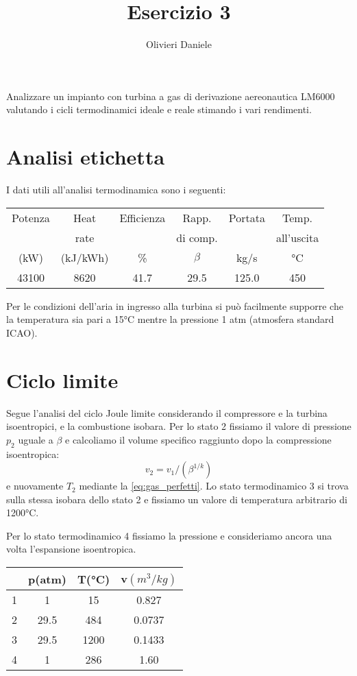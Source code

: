 \documentclass[a4paper,12pt]{article}
\title{Esercizio 3}
\author{Olivieri Daniele}
\date{}
\begin{document}
\maketitle

Analizzare un impianto con turbina a gas di derivazione aereonautica LM6000 valutando i cicli termodinamici ideale e reale stimando i vari rendimenti.
\section{Analisi etichetta}
\label{sec:analisi_etichetta}
I dati utili all'analisi termodinamica sono i seguenti:
\begin{center}
    \begin{tabular}{cccccc}
         Potenza   & Heat  & Efficienza   & Rapp.  & Portata    &  Temp. \\
                   &rate  &              & di comp. &    &        all'uscita \\
            (kW)   &  (kJ/kWh) & \%    &    $\beta$  &   kg/s      &  °C \\ \hline
        43100    &  8620    &  41.7   &  29.5  &     125.0        &  450
    \end{tabular}
\end{center}
Per le condizioni dell'aria in ingresso alla turbina si può facilmente supporre che la temperatura sia pari a 15°C mentre la pressione 1 atm
(atmosfera standard ICAO).

\section{Ciclo limite}
\label{sec:ciclo_limite}
Segue l'analisi del ciclo Joule limite considerando il compressore e la turbina isoentropici, e la combustione isobara.
Per lo stato 2 fissiamo il valore di pressione $p_2$ uguale a $\beta$ e calcoliamo il volume specifico raggiunto dopo la compressione isoentropica:
\begin{equation*}
    v_2 = v_1/(\beta^{1/k})
\end{equation*}
e nuovamente $T_2$ mediante la \eqref{eq:gas_perfetti}.
Lo stato termodinamico 3 si trova sulla stessa isobara dello stato 2 e fissiamo un valore di temperatura arbitrario di 1200°C.

Per lo stato termodinamico 4 fissiamo la pressione e consideriamo ancora una volta l'espansione isoentropica.

\begin{center}
    \begin{tabular}{c|c|c|c}
            &p(atm) &T(°C)  &v$(m^3/kg)$     \\ \hline
        1   &    1  & 15    & 0.827   \\
        2   &   29.5& 484   & 0.0737  \\
        3   &   29.5&1200   & 0.1433   \\
        4   &   1   &286    & 1.60           
    \end{tabular}
\end{center}
\end{document}
